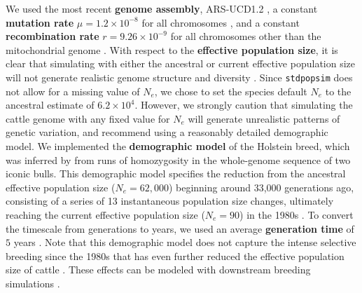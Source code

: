 \documentclass[hidelinks]{article}
\newcommand{\stdpopsim}{\texttt{stdpopsim}\xspace}
\begin{document}
We used the most recent \textbf{genome assembly}, ARS-UCD1.2
\citep{Rosen2020}, a constant \textbf{mutation rate} \(\mu=1.2\times 10^{-8}\) for all chromosomes \citep{Harland2017}, 
and a constant \textbf{recombination rate} \(r=9.26 \times 10^{-9}\) for all chromosomes other than the mitochondrial genome \citep{Ma2015}.
With respect to the \textbf{effective population size}, it is clear that simulating with either 
the ancestral or current effective population size will not generate realistic genome structure and diversity \citep{MacLeod2013,Rosen2020}.
Since \stdpopsim  does not allow for a missing value of $N_e$,
we chose to set the species default $N_e$ to the ancestral estimate of $6.2\times 10^4$.
However, we strongly caution that
simulating the cattle genome with any fixed value for $N_e$ will generate unrealistic patterns of genetic variation,
and recommend using a reasonably detailed demographic model.
We implemented the \textbf{demographic model} of the Holstein breed, which was
inferred by \cite{MacLeod2013} from runs of homozygosity in the whole-genome sequence of two iconic bulls.
This demographic model specifies the reduction from the ancestral effective population size ($N_e=62,000$) beginning around 33,000 generations ago, consisting of a series of 13 instantaneous population size changes, ultimately reaching the current effective population size ($N_e=90$) in the 1980s \citep[taken from Supplementary Table S1 in][]{MacLeod2013}.
To convert the timescale from generations to years, we used an average \textbf{generation time} of $5$ years \citep{MacLeod2013}.
Note that this demographic model does not capture the intense selective breeding since the 1980s that has even further reduced the effective population size of cattle \citep{MacLeod2013, VanRaden2020, Makanjouloa2020}. These effects can be modeled with
downstream breeding simulations \citep[e.g.,][]{Gaynor2020}.
\end{document}
